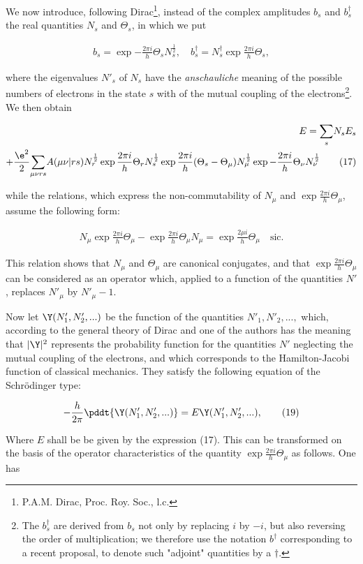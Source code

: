 \documentclass{article}
\newcommand{\nequ}[2]{
\begin{align*}
#1
\tag{#2}
\end{align*}
}
\newcommand{\sumX}[1]{\underset{#1}{\sum}}
\begin{document}
We now introduce, following Dirac\footnote{P.A.M. Dirac, Proc. Roy. Soc., l.c.}, instead of the complex amplitudes $b_s$ and $b^\dagger_s$ the real quantities $N_s$ and $\Theta_s$, in which we put
\nequ{
b_s = \exp{-\frac{2\pi i}{h} \Theta_s} N_s^{\frac{1}{2}},\quad
b^\dagger_s = N^\dagger_s\exp{\frac{2\pi i}{h}\Theta_s},
}{16}
where the eigenvalues $N'_s$ of $N_s$ have the \textit{anschauliche} meaning of the possible numbers of electrons in the state $s$ with  of the mutual coupling of the electrons\footnote{The $b^\dagger_s$ are derived from $b_s$ not only by replacing $i$ by $-i$, but also reversing the order of multiplication; we therefore use the notation $b^\dagger$ corresponding to a recent proposal, to denote such "adjoint" quantities by a $\dagger$.}. We then obtain
\nequ{
E=\sumX{s}N_s E_s\\
+\frac{\e^2}{2}\sumX{\mu\nu r s}
A(\mu\nu | r s)N_r^{\frac{1}{2}}
\exp{\frac{2\pi i}{h}\Theta_r}N_s^{\frac{1}{2}}
\exp{\frac{2\pi i}{h}(\Theta_s - \Theta_\mu)}N_\mu^{\frac{1}{2}}
\exp{-\frac{2\pi i}{h}\Theta_\nu} N_\nu^{\frac{1}{2}}
}{17}
while the relations, which express the non-commutability of $N_\mu$ and $\exp{\frac{2\pi i}{h}\Theta_\mu}$, assume the following form:
\nequ{
N_\mu \exp{\frac{2\pi i}{h}\Theta_\mu} - \exp{\frac{2\pi i}{h}\Theta_\mu} N_\mu = \exp{\frac{2\mu i}{h}\Theta_\mu}\quad\text{sic}.
}{18}
This relation shows that $N_\mu$ and $\Theta_\mu$ are canonical conjugates, and that $\exp{\frac{2\pi i}{h}\Theta_\mu}$ can be considered as an operator which, applied to a function of the quantities $N'$, replaces $N'_\mu$ by $N'_\mu - 1$.

Now let $\Y(N'_1, N'_2, ...)$ be the function of the quantities $N'_1,N'_2,...,$ which, according to the general theory of Dirac and one of the authors has the meaning that $|\Y|^2$ represents the probability function for the quantities $N'$ neglecting the mutual coupling of the electrons, and which corresponds to the Hamilton-Jacobi function of classical mechanics. They satisfy the following equation of the Schrödinger type:
\nequ{
-\frac{h}{2\pi}\pddt{\Y(N'_1,N'_2,...)} = E\Y(N'_1,N'_2,...),
}{19}

Where $E$ shall be be given by the expression (17). This can be transformed on the basis of the operator characteristics of the quantity $\exp{\frac{2\pi i}{h}\Theta_\mu}$ as follows. One has
\end{document}
